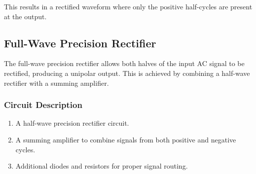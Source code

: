 \documentclass[journal]{IEEEtran}
\begin{document}
	This results in a rectified waveform where only the positive half-cycles are present at the output.
	
	\subsection*{Full-Wave Precision Rectifier}
	
	The full-wave precision rectifier allows both halves of the input AC signal to be rectified, producing a unipolar output. This is achieved by combining a half-wave rectifier with a summing amplifier.
	
	\subsubsection*{Circuit Description}
	\begin{enumerate}
		\item A half-wave precision rectifier circuit.
		\item A summing amplifier to combine signals from both positive and negative cycles.
		\item Additional diodes and resistors for proper signal routing.
	\end{enumerate}
	
\end{document}
